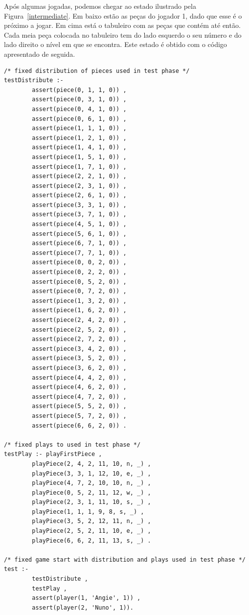\documentclass[a4paper]{article}
\begin{document}
Após algumas jogadas, podemos chegar ao estado ilustrado pela Figura~\ref{intermediate}. Em baixo estão as peças do jogador 1, dado que esse é o próximo a jogar. Em cima está o tabuleiro com as peças que contém até então. Cada meia peça colocada no tabuleiro tem do lado esquerdo o seu número e do lado direito o nível em que se encontra. Este estado é obtido com o código apresentado de seguida.


\begin{lstlisting}
/* fixed distribution of pieces used in test phase */	
testDistribute :-
        assert(piece(0, 1, 1, 0)) ,
        assert(piece(0, 3, 1, 0)) , 
        assert(piece(0, 4, 1, 0)) , 
        assert(piece(0, 6, 1, 0)) , 
        assert(piece(1, 1, 1, 0)) , 
        assert(piece(1, 2, 1, 0)) , 
        assert(piece(1, 4, 1, 0)) , 
        assert(piece(1, 5, 1, 0)) , 
        assert(piece(1, 7, 1, 0)) , 
        assert(piece(2, 2, 1, 0)) , 
        assert(piece(2, 3, 1, 0)) , 
        assert(piece(2, 6, 1, 0)) , 
        assert(piece(3, 3, 1, 0)) , 
        assert(piece(3, 7, 1, 0)) , 
        assert(piece(4, 5, 1, 0)) , 
        assert(piece(5, 6, 1, 0)) , 
        assert(piece(6, 7, 1, 0)) ,
        assert(piece(7, 7, 1, 0)) ,
        assert(piece(0, 0, 2, 0)) ,
        assert(piece(0, 2, 2, 0)) , 
        assert(piece(0, 5, 2, 0)) , 
        assert(piece(0, 7, 2, 0)) , 
        assert(piece(1, 3, 2, 0)) , 
        assert(piece(1, 6, 2, 0)) , 
        assert(piece(2, 4, 2, 0)) , 
        assert(piece(2, 5, 2, 0)) , 
        assert(piece(2, 7, 2, 0)) , 
        assert(piece(3, 4, 2, 0)) , 
        assert(piece(3, 5, 2, 0)) , 
        assert(piece(3, 6, 2, 0)) , 
        assert(piece(4, 4, 2, 0)) , 
        assert(piece(4, 6, 2, 0)) , 
        assert(piece(4, 7, 2, 0)) , 
        assert(piece(5, 5, 2, 0)) , 
        assert(piece(5, 7, 2, 0)) , 
        assert(piece(6, 6, 2, 0)) .

/* fixed plays to used in test phase */
testPlay :- playFirstPiece ,
        playPiece(2, 4, 2, 11, 10, n, _) ,
        playPiece(3, 3, 1, 12, 10, e, _) ,
        playPiece(4, 7, 2, 10, 10, n, _) ,
        playPiece(0, 5, 2, 11, 12, w, _) ,
        playPiece(2, 3, 1, 11, 10, s, _) ,
        playPiece(1, 1, 1, 9, 8, s, _) ,
        playPiece(3, 5, 2, 12, 11, n, _) ,
        playPiece(2, 5, 2, 11, 10, e, _) ,
        playPiece(6, 6, 2, 11, 13, s, _) .

/* fixed game start with distribution and plays used in test phase */
test :- 
        testDistribute , 
        testPlay , 
        assert(player(1, 'Angie', 1)) , 
        assert(player(2, 'Nuno', 1)).
\end{lstlisting}
\end{document}
